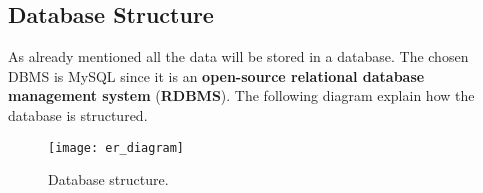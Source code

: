 \subsection{Database Structure}
As already mentioned all the data will be stored in a database. The chosen DBMS is MySQL since it is an \textbf{open-source relational database management system} (\textbf{RDBMS}).\newline
The following diagram explain how the database is structured. 
\begin{figure}[H]
	\centering
	\texttt{[image: er\_diagram]}
	\caption{Database structure.}
	\label{fig:er_diagram}
\end{figure}

